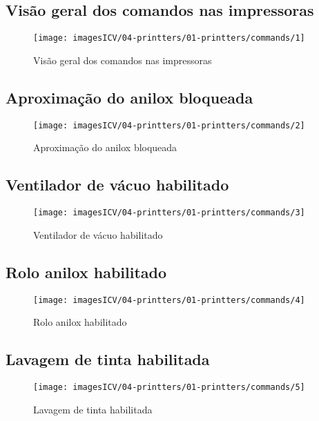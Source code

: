 \usepackage{graphicx}
\newpage
\thispagestyle{fancy}
\vspace{\fill}

\subsection{Visão geral dos comandos nas impressoras}
\begin{figure}
    \centering
    \texttt{[image: imagesICV/04-printters/01-printters/commands/1]}
    \caption{Visão geral dos comandos nas impressoras}
\end{figure}
\newpage
\thispagestyle{fancy}
\vspace{\fill}

\subsection{Aproximação do anilox bloqueada}
\begin{figure}
    \centering
    \texttt{[image: imagesICV/04-printters/01-printters/commands/2]}
    \caption{Aproximação do anilox bloqueada}
\end{figure}
\newpage
\thispagestyle{fancy}
\vspace{\fill}

\subsection{Ventilador de vácuo habilitado}
\begin{figure}
    \centering
    \texttt{[image: imagesICV/04-printters/01-printters/commands/3]}
    \caption{Ventilador de vácuo habilitado}
\end{figure}
\newpage
\thispagestyle{fancy}
\vspace{\fill}

\subsection{Rolo anilox habilitado}
\begin{figure}
    \centering
    \texttt{[image: imagesICV/04-printters/01-printters/commands/4]}
    \caption{Rolo anilox habilitado}
\end{figure}
\newpage
\thispagestyle{fancy}
\vspace{\fill}

\subsection{Lavagem de tinta habilitada}
\begin{figure}
    \centering
    \texttt{[image: imagesICV/04-printters/01-printters/commands/5]}
    \caption{Lavagem de tinta habilitada}
\end{figure}
\newpage
\thispagestyle{fancy}
\vspace{\fill}

